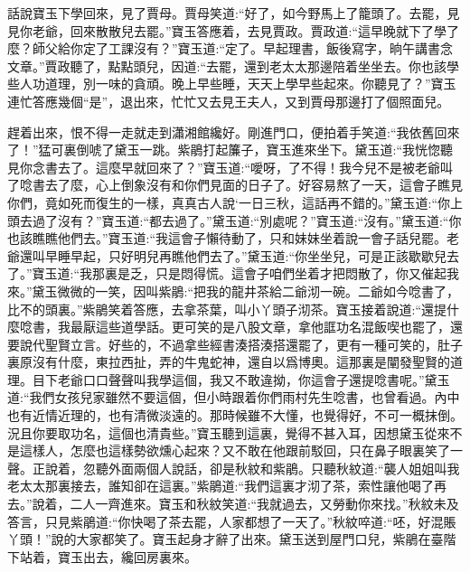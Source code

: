 


\begin{parag}
    話說寶玉下學回來，見了賈母。賈母笑道:“好了，如今野馬上了籠頭了。去罷，見見你老爺，回來散散兒去罷。”寶玉答應着，去見賈政。賈政道:“這早晚就下了學了麼？師父給你定了工課沒有？”寶玉道:“定了。早起理書，飯後寫字，晌午講書念文章。”賈政聽了，點點頭兒，因道:“去罷，還到老太太那邊陪着坐坐去。你也該學些人功道理，別一味的貪頑。晚上早些睡，天天上學早些起來。你聽見了？”寶玉連忙答應幾個“是”，退出來，忙忙又去見王夫人，又到賈母那邊打了個照面兒。
\end{parag}


\begin{parag}
    趕着出來，恨不得一走就走到瀟湘館纔好。剛進門口，便拍着手笑道:“我依舊回來了！”猛可裏倒唬了黛玉一跳。紫鵑打起簾子，寶玉進來坐下。黛玉道:“我恍惚聽見你念書去了。這麼早就回來了？”寶玉道:“噯呀，了不得！我今兒不是被老爺叫了唸書去了麼，心上倒象沒有和你們見面的日子了。好容易熬了一天，這會子瞧見你們，竟如死而復生的一樣，真真古人說‘一日三秋，這話再不錯的。”黛玉道:“你上頭去過了沒有？”寶玉道:“都去過了。”黛玉道:“別處呢？”寶玉道:“沒有。”黛玉道:“你也該瞧瞧他們去。”寶玉道:“我這會子懶待動了，只和妹妹坐着說一會子話兒罷。老爺還叫早睡早起，只好明兒再瞧他們去了。”黛玉道:“你坐坐兒，可是正該歇歇兒去了。”寶玉道:“我那裏是乏，只是悶得慌。這會子咱們坐着才把悶散了，你又催起我來。”黛玉微微的一笑，因叫紫鵑:“把我的龍井茶給二爺沏一碗。二爺如今唸書了，比不的頭裏。”紫鵑笑着答應，去拿茶葉，叫小丫頭子沏茶。寶玉接着說道:“還提什麼唸書，我最厭這些道學話。更可笑的是八股文章，拿他誆功名混飯喫也罷了，還要說代聖賢立言。好些的，不過拿些經書湊搭湊搭還罷了，更有一種可笑的，肚子裏原沒有什麼，東拉西扯，弄的牛鬼蛇神，還自以爲博奧。這那裏是闡發聖賢的道理。目下老爺口口聲聲叫我學這個，我又不敢違拗，你這會子還提唸書呢。”黛玉道:“我們女孩兒家雖然不要這個，但小時跟着你們雨村先生唸書，也曾看過。內中也有近情近理的，也有清微淡遠的。那時候雖不大懂，也覺得好，不可一概抹倒。況且你要取功名，這個也清貴些。”寶玉聽到這裏，覺得不甚入耳，因想黛玉從來不是這樣人，怎麼也這樣勢欲燻心起來？又不敢在他跟前駁回，只在鼻子眼裏笑了一聲。正說着，忽聽外面兩個人說話，卻是秋紋和紫鵑。只聽秋紋道:“襲人姐姐叫我老太太那裏接去，誰知卻在這裏。”紫鵑道:“我們這裏才沏了茶，索性讓他喝了再去。”說着，二人一齊進來。寶玉和秋紋笑道:“我就過去，又勞動你來找。”秋紋未及答言，只見紫鵑道:“你快喝了茶去罷，人家都想了一天了。”秋紋啐道:“呸，好混賬丫頭！”說的大家都笑了。寶玉起身才辭了出來。黛玉送到屋門口兒，紫鵑在臺階下站着，寶玉出去，纔回房裏來。
\end{parag}


